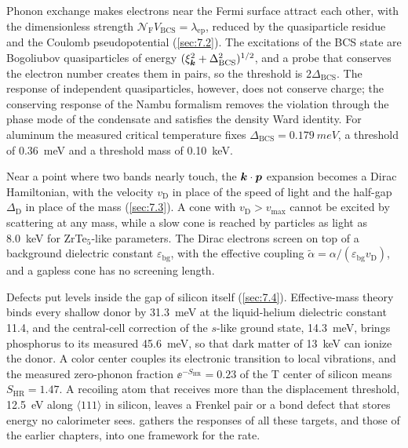 Phonon exchange makes electrons near the Fermi surface attract each other, with the dimensionless strength $\mathcal{N}_{\mathrm{F}}V_{\mathrm{BCS}} = \lambda_{\mathrm{ep}}$, reduced by the quasiparticle residue and the Coulomb pseudopotential (\cref{sec:7.2}). The excitations of the BCS state are Bogoliubov quasiparticles of energy $(\xi_{\bm{k}}^2 + \Delta_{\mathrm{BCS}}^2)^{1/2}$, and a probe that conserves the electron number creates them in pairs, so the threshold is $2\Delta_{\mathrm{BCS}}$. The response of independent quasiparticles, however, does not conserve charge; the conserving response of the Nambu formalism removes the violation through the phase mode of the condensate and satisfies the density Ward identity. For aluminum the measured critical temperature fixes $\Delta_{\mathrm{BCS}} = \SI{0.179}{meV}$, a threshold of \SI{0.36}{meV} and a threshold mass of \SI{0.10}{keV}.

Near a point where two bands nearly touch, the $\bm{k}\cdot\bm{p}$ expansion becomes a Dirac Hamiltonian, with the velocity $v_{\mathrm{D}}$ in place of the speed of light and the half-gap $\Delta_{\mathrm{D}}$ in place of the mass (\cref{sec:7.3}). A cone with $v_{\mathrm{D}} > v_{\mathrm{max}}$ cannot be excited by scattering at any mass, while a slow cone is reached by particles as light as \SI{8.0}{keV} for ZrTe$_5$-like parameters. The Dirac electrons screen on top of a background dielectric constant $\varepsilon_{\mathrm{bg}}$, with the effective coupling $\tilde\alpha = \alpha/(\varepsilon_{\mathrm{bg}}v_{\mathrm{D}})$, and a gapless cone has no screening length.

Defects put levels inside the gap of silicon itself (\cref{sec:7.4}). Effective-mass theory binds every shallow donor by \SI{31.3}{meV} at the liquid-helium dielectric constant 11.4, and the central-cell correction of the $s$-like ground state, \SI{14.3}{meV}, brings phosphorus to its measured \SI{45.6}{meV}, so that dark matter of \SI{13}{keV} can ionize the donor. A color center couples its electronic transition to local vibrations, and the measured zero-phonon fraction $\ee^{-S_{\mathrm{HR}}} = 0.23$ of the T center of silicon means $S_{\mathrm{HR}} = 1.47$. A recoiling atom that receives more than the displacement threshold, \SI{12.5}{eV} along $\langle111\rangle$ in silicon, leaves a Frenkel pair or a bond defect that stores energy no calorimeter sees.  gathers the responses of all these targets, and those of the earlier chapters, into one framework for the rate.
